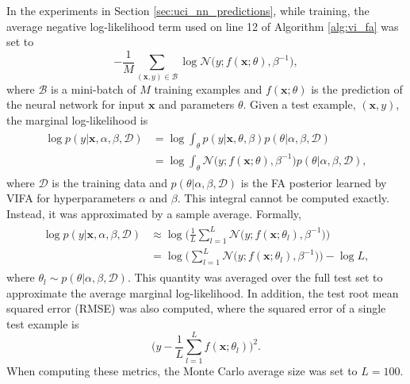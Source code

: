 \documentclass[msc,deptreport.inf]{infthesis} %
\newcommand{\matr}[1]{\mathbf{#1}}
\begin{document}
In the experiments in Section \ref{sec:uci_nn_predictions}, while training, the average negative log-likelihood term used on line 12 of Algorithm \ref{alg:vi_fa} was set to
\begin{equation}\label{eqn:train_nll}
	-\frac{1}{M} \sum_{(\matr{x}, y) \in \mathcal{B}} \log \mathcal{N}\big(y; f(\matr{x}; \theta), \beta^{-1}\big),
\end{equation}
where $\mathcal{B}$ is a mini-batch of $M$ training examples and $f(\matr{x}; \theta)$ is the prediction of the neural network for input $\matr{x}$ and parameters $\theta$. Given a test example, $(\matr{x}, y)$, the marginal log-likelihood is
\begin{align}
\begin{split}
	\log p(y | \matr{x}, \alpha, \beta, \mathcal{D}) 
	& = \log \int_\theta p(y | \matr{x}, \theta, \beta) p(\theta | \alpha, \beta, \mathcal{D}) \\
	& = \log \int_\theta \mathcal{N}\big(y; f(\matr{x}; \theta), \beta^{-1}\big) p(\theta | \alpha, \beta, \mathcal{D}),
\end{split}
\end{align}
where $\mathcal{D}$ is the training data and $p(\theta | \alpha, \beta, \mathcal{D})$ is the FA posterior learned by VIFA for hyperparameters $\alpha$ and $\beta$. This integral cannot be computed exactly. Instead, it was approximated by a sample average. Formally, 
\begin{align}
\begin{split}
	\log p(y | \matr{x}, \alpha, \beta, \mathcal{D}) 
	& \approx \log \Bigg( \frac{1}{L} \sum_{l=1}^L \mathcal{N}\big(y; f(\matr{x}; \theta_l), \beta^{-1}\big) \Bigg) \\
	& = \log \Bigg( \sum_{l=1}^L \mathcal{N}\big(y; f(\matr{x}; \theta_l), \beta^{-1}\big) \Bigg) - \log L,
\end{split}
\end{align}
where $\theta_l \sim p(\theta | \alpha, \beta, \mathcal{D})$. This quantity was averaged over the full test set to approximate the average marginal log-likelihood. In addition, the test root mean squared error (RMSE) was also computed, where the squared error of a single test example is
\begin{equation}
	\Bigg(y - \frac{1}{L} \sum_{l=1}^L f(\matr{x}; \theta_l)\Bigg)^2.
\end{equation}
When computing these metrics, the Monte Carlo average size was set to $L=100$.
\end{document}
